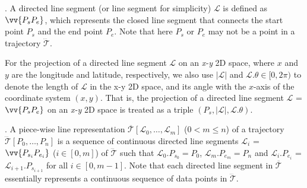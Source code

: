 . A directed line segment (or line segment for simplicity) $\mathcal{L}$ is defined as $\vv{P_{s}P_{e}}$, which represents the closed line segment that connects the start point $P_s$ and the end point $P_e$.
Note that here $P_s$ or $P_e$ may not be a point in a trajectory $\dddot{\mathcal{T}}$.


For the projection of a directed line segment $\mathcal{L}$ on an \emph{x-y} 2D space, where $x$ and $y$ are the longitude and latitude, respectively, we also use $|\mathcal{L}|$ and $\mathcal{L}.\theta\in [0, 2\pi)$ to denote the length of $\mathcal{L}$ in the x-y 2D space, and its angle with the $x$-axis of the coordinate system $(x, y)$.  That is, the projection of a directed line segment $\mathcal{L}$ = $\vv{P_{s}P_{e}}$ on an \emph{x-y} 2D space is treated as a triple $(P_s, |\mathcal{L}|, \mathcal{L}.\theta)$.


. A piece-wise line representation $\overline{\mathcal{T}}[\mathcal{L}_0, \ldots , \mathcal{L}_m]$ ($0< m \le n$) of a trajectory $\dddot{\mathcal{T}}[P_0, \ldots, P_n]$ is a sequence of continuous directed line segments $\mathcal{L}_{i}$ = $\vv{P_{s_i}P_{e_i}}$ ($i\in[0,m]$) of $\dddot{\mathcal{T}}$  such that $\mathcal{L}_{0}.P_{s_0} = P_0$, $\mathcal{L}_{m}.P_{e_m} = P_n$ and  $\mathcal{L}_{i}.P_{e_i}$ = $\mathcal{L}_{i+1}.P_{s_{i+1}}$ for all $i\in[0, m-1]$. Note that each directed line segment in $\overline{\mathcal{T}}$ essentially represents a continuous sequence of data points in $\dddot{\mathcal{T}}$.


